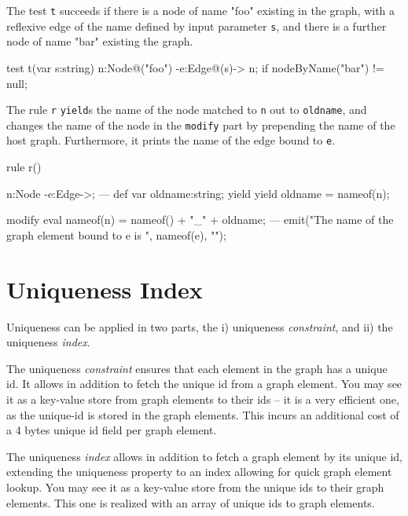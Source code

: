 \begin{example}
The test \texttt{t} succeeds if there is a node of name "foo" existing in the graph, with a reflexive edge of the name defined by input parameter \texttt{s}, and there is a further node of name "bar" existing the graph.

\begin{grgen}
test t(var s:string) {
  n:Node{@("foo")} -e:Edge{@(s)}-> n;
  if{ nodeByName("bar") != null; }
}
\end{grgen}

The rule \texttt{r} \texttt{yield}s the name of the node matched to \texttt{n} out to \texttt{oldname}, and changes the name of the node in the \texttt{modify} part by prepending the name of the host graph. Furthermore, it prints the name of the edge bound to \texttt{e}.

\begin{grgen}
rule r() {
  n:Node -e:Edge->;
---
  def var oldname:string;
  yield { yield oldname = nameof(n); }
		
  modify {
    eval {
      nameof(n) = nameof() + "_" + oldname;
    }
  ---
    emit("The name of the graph element bound to e is ", nameof(e), "\n");
  }
}
\end{grgen}

\end{example}


\section{Uniqueness Index}\label{sec:uniqueness}
Uniqueness can be applied in two parts, the i) uniqueness \emph{constraint}, and ii) the uniqueness \emph{index}.

The uniqueness \emph{constraint} ensures that each element in the graph has a unique id. 
It allows in addition to fetch the unique id from a graph element.
You may see it as a key-value store from graph elements to their ids -- it is a very efficient one, as the unique-id is stored in the graph elements. 
This incurs an additional cost of a 4 bytes unique id field per graph element.

The uniqueness \emph{index} allows in addition to fetch a graph element by its unique id, extending the uniqueness property to an index allowing for quick graph element lookup.
You may see it as a key-value store from the unique ids to their graph elements.
This one is realized with an array of unique ids to graph elements.

